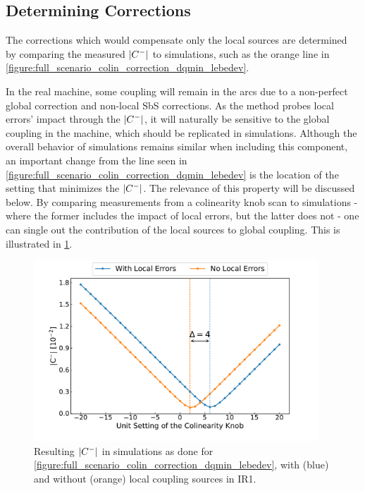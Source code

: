 \subsection{Determining Corrections}

The corrections which would compensate only the local sources are determined by comparing the measured \(\left\lvert C^{-} \right\rvert\) to simulations, such as the orange line in \cref{figure:full_scenario_colin_correction_dqmin_lebedev}.

In the real machine, some coupling will remain in the arcs due to a non-perfect global correction and non-local SbS corrections.
As the method probes local errors' impact through the \(\left\lvert C^{-} \right\rvert\), it will naturally be sensitive to the global coupling in the machine, which should be replicated in simulations.
Although the overall behavior of simulations remains similar when including this component, an important change from the line seen in \cref{figure:full_scenario_colin_correction_dqmin_lebedev} is the location of the setting that minimizes the \(\left\lvert C^{-} \right\rvert\).
The relevance of this property will be discussed below.
By comparing measurements from a colinearity knob scan to simulations - where the former includes the impact of local errors, but the latter does not - one can single out the contribution of the local sources to global coupling.
This is illustrated in \cref{figure:full_scenario_determine_correction}.

\begin{figure}[!htb]
    \centering
    \includegraphics*[width=0.95\textwidth]{Figures/IR_Coupling_Correction/full_scenario_determine_correction.pdf}
    \caption{Resulting \(\left\lvert C^{-} \right\rvert\) in simulations as done for \cref{figure:full_scenario_colin_correction_dqmin_lebedev}, with (\textcolor{mplblue}{blue}) and without (\textcolor{mplorange}{orange}) local coupling sources in IR\num{1}.}
    \label{figure:full_scenario_determine_correction}
\end{figure}

